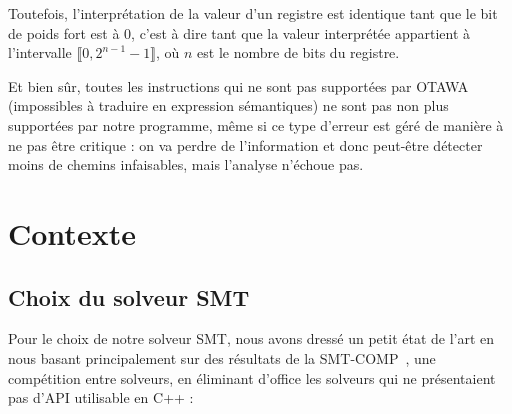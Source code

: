 \documentclass[french]{article}
\begin{document}
  Toutefois, l'interprétation de la valeur d'un registre est identique tant que le bit de poids fort est à 0, c'est à dire tant que la valeur interprétée appartient à l'intervalle $\llbracket0, 2^{n-1}-1\rrbracket$, où $n$ est le nombre de bits du registre.

  Et bien sûr, toutes les instructions qui ne sont pas supportées par OTAWA (impossibles à traduire en expression sémantiques) ne sont pas non plus supportées par notre programme, même si ce type d'erreur est géré de manière à ne pas être critique : on va perdre de l'information et donc peut-être détecter moins de chemins infaisables, mais l'analyse n'échoue pas.

  \newpage{}
  \section{Contexte}
  \subsection{Choix du solveur SMT}
  Pour le choix de notre solveur SMT, nous avons dressé un petit état de l'art en nous basant principalement sur des résultats de la SMT-COMP~\cite{SMT-COMP}, une compétition entre solveurs, en éliminant d'office les solveurs qui ne présentaient pas d'API utilisable en C++ :
\end{document}
